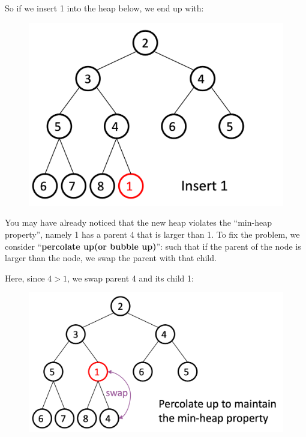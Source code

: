 \begin{spacing}{1.3}
    So if we insert 1 into the heap below, we end up with:
    \begin{figure}[htbp]
        \centering
        \includegraphics[scale=0.25]{images/05-insert-1.png}
    \end{figure}

    You may have already noticed that the new heap violates the ``min-heap property'', namely
    1 has a parent 4 that is larger than 1. To fix the problem, we consider 
    ``{\bf percolate up(or bubble up)}'': such that if the parent of the node is 
    larger than the node, we swap the parent with that child.

    Here, since $4>1$, we swap parent 4 and its child 1:
    \begin{figure}[htbp]
        \centering
        \qquad 
        \includegraphics[scale=0.25]{images/05-insert-2.png}
    \end{figure}


\end{spacing}
